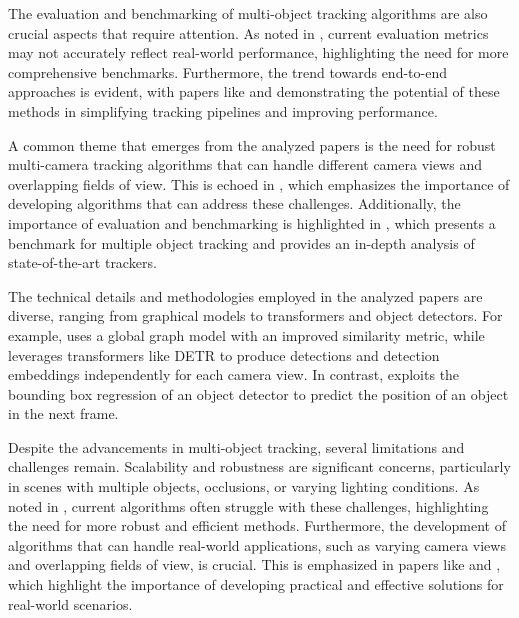 \documentclass[conference]{IEEEtran}
\begin{document}
The evaluation and benchmarking of multi-object tracking algorithms are also crucial aspects that require attention. As noted in \cite{Tracking the Trackers: An Analysis of the State of the Art in Multiple Object Tracking}, current evaluation metrics may not accurately reflect real-world performance, highlighting the need for more comprehensive benchmarks. Furthermore, the trend towards end-to-end approaches is evident, with papers like \cite{MCTR: Multi Camera Tracking Transformer} and \cite{Tracking without bells and whistles} demonstrating the potential of these methods in simplifying tracking pipelines and improving performance.

A common theme that emerges from the analyzed papers is the need for robust multi-camera tracking algorithms that can handle different camera views and overlapping fields of view. This is echoed in \cite{Challenge of Multi-Camera Tracking}, which emphasizes the importance of developing algorithms that can address these challenges. Additionally, the importance of evaluation and benchmarking is highlighted in \cite{Tracking the Trackers: An Analysis of the State of the Art in Multiple Object Tracking}, which presents a benchmark for multiple object tracking and provides an in-depth analysis of state-of-the-art trackers.

The technical details and methodologies employed in the analyzed papers are diverse, ranging from graphical models to transformers and object detectors. For example, \cite{An equalised global graphical model-based approach for multi-camera object tracking} uses a global graph model with an improved similarity metric, while \cite{MCTR: Multi Camera Tracking Transformer} leverages transformers like DETR to produce detections and detection embeddings independently for each camera view. In contrast, \cite{Tracking without bells and whistles} exploits the bounding box regression of an object detector to predict the position of an object in the next frame.

Despite the advancements in multi-object tracking, several limitations and challenges remain. Scalability and robustness are significant concerns, particularly in scenes with multiple objects, occlusions, or varying lighting conditions. As noted in \cite{Challenge of Multi-Camera Tracking}, current algorithms often struggle with these challenges, highlighting the need for more robust and efficient methods. Furthermore, the development of algorithms that can handle real-world applications, such as varying camera views and overlapping fields of view, is crucial. This is emphasized in papers like \cite{MCTR: Multi Camera Tracking Transformer} and \cite{Challenge of Multi-Camera Tracking}, which highlight the importance of developing practical and effective solutions for real-world scenarios.
\end{document}
